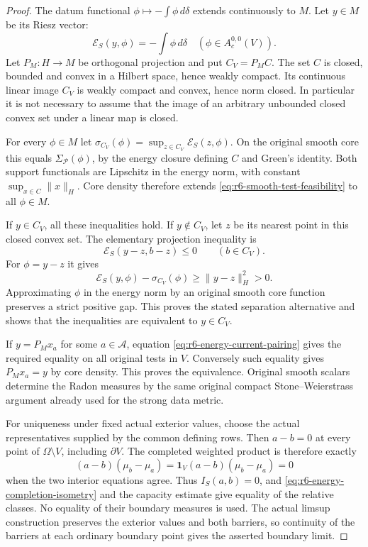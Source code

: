 \documentclass[11pt,a4paper]{article}
\numberwithin{equation}{section}
\theoremstyle{definition}
\theoremstyle{remark}
\begin{document}
\begin{proof}
The datum functional
$\phi\mapsto-\int\phi\,d\delta$ extends continuously to $M$.
Let $y\in M$ be its Riesz vector:
\[
          \mathcal E_S(y,\phi)=-\int\phi\,d\delta
                                    \quad(\phi\in A_c^{0,0}(V)).
\]
Let $P_M:H\to M$ be orthogonal projection and put $C_V=P_M C$.
The set $C$ is closed, bounded and convex in a Hilbert space, hence
weakly compact. Its continuous linear image $C_V$ is weakly compact
and convex, hence norm closed. In particular it is not necessary to
assume that the image of an arbitrary unbounded closed convex set
under a linear map is closed.

For every $\phi\in M$ let
$\sigma_{C_V}(\phi)=\sup_{z\in C_V}\mathcal E_S(z,\phi)$.
On the original smooth core this equals
$\Sigma_{\mathscr P}(\phi)$, by the energy closure defining $C$ and
Green's identity. Both support functionals are Lipschitz in the energy
norm, with constant $\sup_{x\in C}\|x\|_H$. Core density therefore
extends \eqref{eq:r6-smooth-test-feasibility} to all $\phi\in M$.

If $y\in C_V$, all these inequalities hold. If $y\notin C_V$, let
$z$ be its nearest point in this closed convex set. The elementary
projection inequality is
\[
       \mathcal E_S(y-z,b-z)\le0\qquad(b\in C_V).
\]
For $\phi=y-z$ it gives
\[
 \mathcal E_S(y,\phi)-\sigma_{C_V}(\phi)
                              \ge\|y-z\|_H^2>0.
\]
Approximating $\phi$ in the energy norm by an original smooth core
function preserves a strict positive gap. This proves the stated
separation alternative and shows that the inequalities are equivalent
to $y\in C_V$.

If $y=P_Mx_a$ for some $a\in\mathscr A$, equation
\eqref{eq:r6-energy-current-pairing} gives the required equality on all
original tests in $V$. Conversely such equality gives $P_Mx_a=y$ by
core density. This proves the equivalence. Original smooth scalars
determine the Radon measures by the same original compact
Stone--Weierstrass argument already used for the strong data metric.

For uniqueness under fixed actual exterior values, choose the actual
representatives supplied by the common defining rows. Then $a-b=0$
at every point of $\Omega\setminus V$, including $\partial V$.
The completed weighted product is therefore exactly
\[
 (a-b)(\mu_b-\mu_a)=\mathbf1_V(a-b)(\mu_b-\mu_a)=0
\]
when the two interior equations agree. Thus $I_S(a,b)=0$, and
\eqref{eq:r6-energy-completion-isometry} and the capacity estimate give
equality of the relative classes. No equality of their boundary
measures is used. The actual limsup construction preserves the exterior
values and both barriers, so continuity of the barriers at each ordinary
boundary point gives the asserted boundary limit.
\end{proof}
\end{document}
